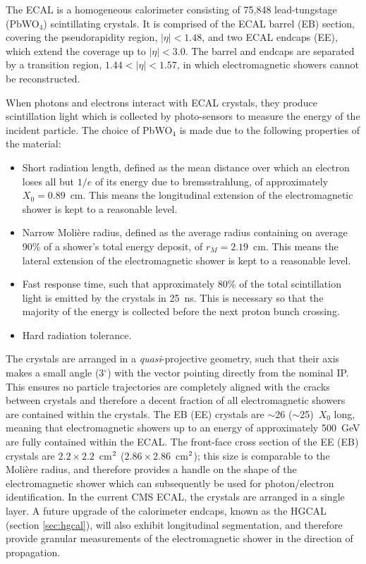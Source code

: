 The ECAL is a homogeneous calorimeter consisting of 75,848 lead-tungstage (PbWO$_4$) scintillating crystals. It is comprised of the ECAL barrel (EB) section, covering the pseudorapidity region, $|\eta|<1.48$, and two ECAL endcaps (EE), which extend the coverage up to $|\eta|<3.0$. The barrel and endcaps are separated by a transition region, $1.44<|\eta|<1.57$, in which electromagnetic showers cannot be reconstructed. 

When photons and electrons interact with ECAL crystals, they produce scintillation light which is collected by photo-sensors to measure the energy of the incident particle. The choice of PbWO$_4$ is made due to the following properties of the material:
\begin{itemize}
    \item Short radiation length, defined as the mean distance over which an electron loses all but $1/e$ of its energy due to bremsstrahlung, of approximately $X_0=0.89$~cm. This means the longitudinal extension of the electromagnetic shower is kept to a reasonable level.
    \item Narrow Moli\`ere radius, defined as the average radius containing on average 90\% of a shower's total energy deposit, of $r_M=2.19$~cm. This means the lateral extension of the electromagnetic shower is kept to a reasonable level.
    \item Fast response time, such that approximately 80\% of the total scintillation light is emitted by the crystals in  25~ns. This is necessary so that the majority of the energy is collected before the next proton bunch crossing.
    \item Hard radiation tolerance.
\end{itemize}

\noindent
The crystals are arranged in a \textit{quasi}-projective geometry, such that their axis makes a small angle (3$^\circ$) with the vector pointing directly from the nominal IP. This ensures no particle trajectories are completely aligned with the cracks between crystals and therefore a decent fraction of all electromagnetic showers are contained within the crystals. The EB (EE) crystals are $\sim$26 ($\sim$25)~$X_0$ long, meaning that electromagnetic showers up to an energy of approximately 500~GeV are fully contained within the ECAL. The front-face cross section of the EE (EB) crystals are $2.2\times2.2$~cm$^{\rm{2}}$ ($2.86\times2.86$~cm$^{\rm{2}}$); this size is comparable to the Moli\`ere radius, and therefore provides a handle on the shape of the electromagnetic shower which can subsequently be used for photon/electron identification. In the current CMS ECAL, the crystals are arranged in a single layer. A future upgrade of the calorimeter endcaps, known as the HGCAL (section \ref{sec:hgcal}), will also exhibit longitudinal segmentation, and therefore provide granular measurements of the electromagnetic shower in the direction of propagation.


